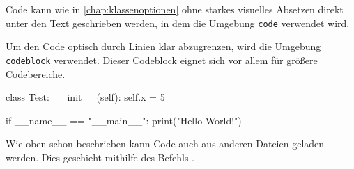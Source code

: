 Code kann wie in \autoref{chap:klassenoptionen} ohne starkes visuelles Absetzen direkt unter den Text geschrieben werden, in dem die Umgebung \texttt{code} verwendet wird.


Um den Code optisch durch Linien klar abzugrenzen, wird die Umgebung \texttt{codeblock} verwendet. Dieser Codeblock eignet sich vor allem für größere Codebereiche.

\begin{code}[latex]
    \begin{codeblock}[python]
        class Test:
            __init__(self):
                self.x = 5

        if __name__ == "__main__":
            print("Hello World!")
    \end{codeblock}
\end{code}

Wie oben schon beschrieben kann Code auch aus anderen Dateien geladen werden. Dies geschieht mithilfe des Befehls \texttt{}.

\begin{code}[latex]
\end{code}
